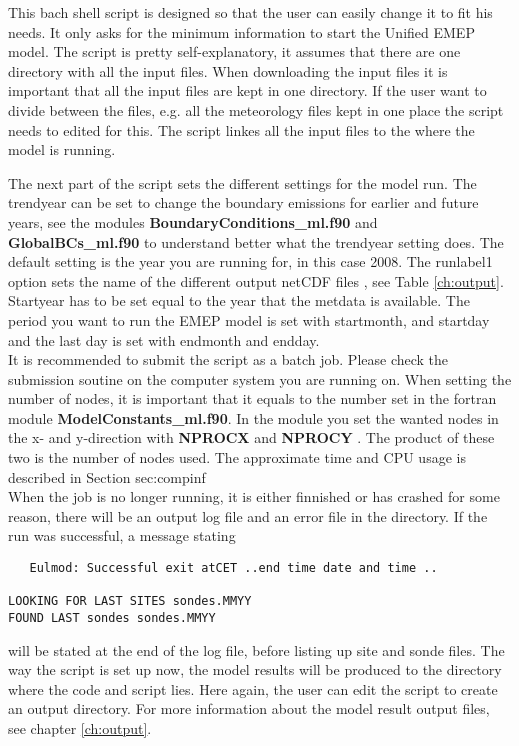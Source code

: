 This bach shell script is designed so that the user can easily 
change it to fit his needs. It only asks for the minimum information 
to start the Unified EMEP model. 
The script is pretty self-explanatory, it assumes that there are one directory 
with all the input files. 
When downloading the input files it is important that all the input files 
are kept in one directory. If the user want to divide between the files, e.g. 
all the meteorology files kept in one place the script needs to edited for this.  
The script linkes all the input files to the where the model is running. 

The next part of the script sets the different settings for the model run. 
The trendyear can be set to change the boundary emissions for 
earlier and future years, see the modules {\bf BoundaryConditions\_ml.f90 } 
and {\bf GlobalBCs\_ml.f90 } to understand better what the trendyear 
setting does. The default setting is the year you are running for, in this case 
2008. 
The runlabel1 option sets the name of the different output netCDF 
files , see Table \ref{ch:output}. 
Startyear has to be set equal to the year 
that the metdata is available. The period you want to run the 
EMEP model is set with startmonth, and startday and the last day is 
set with endmonth and endday. \\

It is recommended to submit the script as a batch job. Please check the submission soutine 
on the computer system you are running on. 
When setting the number of nodes, it is important that it equals to the number set in the fortran module 
{\bf ModelConstants\_ml.f90}. In the module you set the wanted nodes in the x- and y-direction with {\bf NPROCX } and 
{\bf NPROCY }. The product of these two is the number of nodes used. 
The approximate time and CPU usage is described in Section {sec:compinf}\\

When the job is no longer running, it is either finnished or has crashed for some reason, 
there will be an output log file and an error file in the directory. 
If the run was successful, a message stating 
\begin{verbatim}
   Eulmod: Successful exit atCET ..end time date and time ..

LOOKING FOR LAST SITES sondes.MMYY
FOUND LAST sondes sondes.MMYY

\end{verbatim}
will be stated at the end of the log file, before listing up site and sonde files. 
The way the script is set up now, the model results will be produced to the directory where 
the code and script lies. 
Here again, the user can edit the script to create an output directory. 
For more information about the model result output files, see chapter \ref{ch:output}.\\

